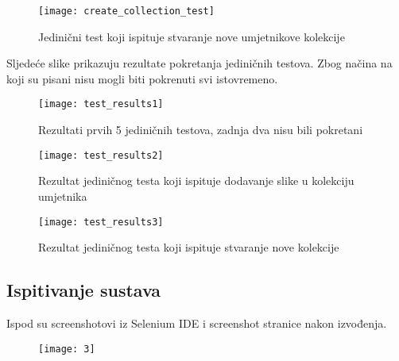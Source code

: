 {				\begin{figure}[H]
					
					\texttt{[image: create\_collection\_test]}
					\caption{Jedinični test koji ispituje stvaranje nove umjetnikove kolekcije}
					
				\end{figure}
			
			{Sljedeće slike prikazuju rezultate pokretanja jediničnih testova. Zbog načina na koji su pisani nisu mogli biti pokrenuti svi istovremeno.}
				\begin{figure}[H]
					
					\texttt{[image: test\_results1]}
					\caption{Rezultati prvih 5 jediničnih testova, zadnja dva nisu bili pokretani}
					
				\end{figure}
			
				\begin{figure}[H]
					
					\texttt{[image: test\_results2]}
					\caption{Rezultat jediničnog testa koji ispituje dodavanje slike u kolekciju umjetnika}
					
				\end{figure}
				
				\begin{figure}[H]
					
					\texttt{[image: test\_results3]}
					\caption{Rezultat jediničnog testa koji ispituje stvaranje nove kolekcije}
					
				\end{figure}
			
			\eject	
			
			\subsection{Ispitivanje sustava}
			
			Ispod su screenshotovi iz Selenium IDE i screenshot stranice nakon izvođenja.
			
			 \begin{figure}[H]
			 	
			 	\texttt{[image: 3]}
			 	
			 	
			 \end{figure}
		 
}
